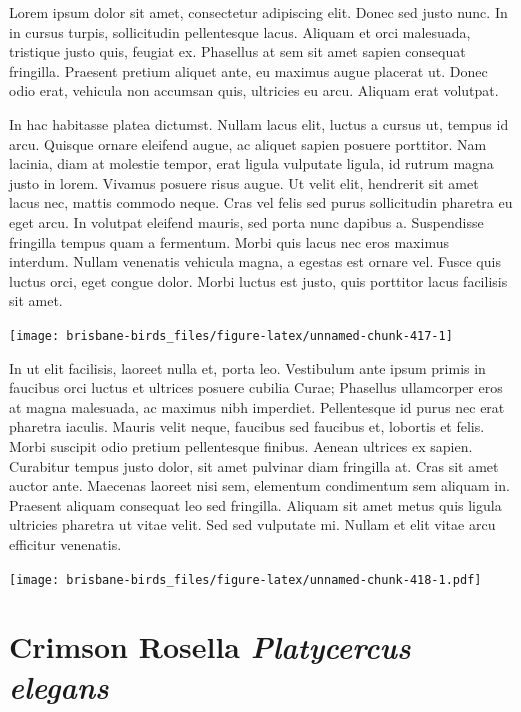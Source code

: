\documentclass[]{book}
\let\origfigure\figure
\let\endorigfigure\endfigure
\renewenvironment{figure}[1][2] {
  \expandafter\origfigure\expandafter[H]
} {
  \endorigfigure
}
\begin{document}
Lorem ipsum dolor sit amet, consectetur adipiscing elit. Donec sed justo
nunc. In in cursus turpis, sollicitudin pellentesque lacus. Aliquam et
orci malesuada, tristique justo quis, feugiat ex. Phasellus at sem sit
amet sapien consequat fringilla. Praesent pretium aliquet ante, eu
maximus augue placerat ut. Donec odio erat, vehicula non accumsan quis,
ultricies eu arcu. Aliquam erat volutpat.

In hac habitasse platea dictumst. Nullam lacus elit, luctus a cursus ut,
tempus id arcu. Quisque ornare eleifend augue, ac aliquet sapien posuere
porttitor. Nam lacinia, diam at molestie tempor, erat ligula vulputate
ligula, id rutrum magna justo in lorem. Vivamus posuere risus augue. Ut
velit elit, hendrerit sit amet lacus nec, mattis commodo neque. Cras vel
felis sed purus sollicitudin pharetra eu eget arcu. In volutpat eleifend
mauris, sed porta nunc dapibus a. Suspendisse fringilla tempus quam a
fermentum. Morbi quis lacus nec eros maximus interdum. Nullam venenatis
vehicula magna, a egestas est ornare vel. Fusce quis luctus orci, eget
congue dolor. Morbi luctus est justo, quis porttitor lacus facilisis sit
amet.

\begin{figure}
\texttt{[image: brisbane-birds\_files/figure-latex/unnamed-chunk-417-1]} \caption{insert figure caption}\label{fig:unnamed-chunk-417}
\end{figure}

In ut elit facilisis, laoreet nulla et, porta leo. Vestibulum ante ipsum
primis in faucibus orci luctus et ultrices posuere cubilia Curae;
Phasellus ullamcorper eros at magna malesuada, ac maximus nibh
imperdiet. Pellentesque id purus nec erat pharetra iaculis. Mauris velit
neque, faucibus sed faucibus et, lobortis et felis. Morbi suscipit odio
pretium pellentesque finibus. Aenean ultrices ex sapien. Curabitur
tempus justo dolor, sit amet pulvinar diam fringilla at. Cras sit amet
auctor ante. Maecenas laoreet nisi sem, elementum condimentum sem
aliquam in. Praesent aliquam consequat leo sed fringilla. Aliquam sit
amet metus quis ligula ultricies pharetra ut vitae velit. Sed sed
vulputate mi. Nullam et elit vitae arcu efficitur venenatis.

\begin{figure}
\centering
\texttt{[image: brisbane-birds\_files/figure-latex/unnamed-chunk-418-1.pdf]}
\caption{\label{fig:unnamed-chunk-418}insert figure caption}
\end{figure}

\section{\texorpdfstring{Crimson Rosella \emph{Platycercus
elegans}}{Crimson Rosella Platycercus elegans}}\label{crimson-rosella-platycercus-elegans}
\end{document}
